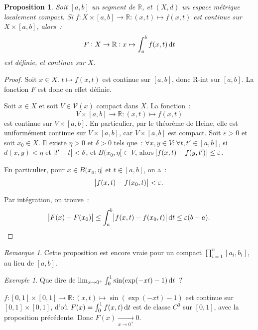 \documentclass{report}
\newtheorem{prp}[thm]{Proposition}
\theoremstyle{definition}
\theoremstyle{remark}
\newtheorem*{rmq}{Remarque}
\newtheorem{ex}{Exemple}[chapter]
\numberwithin{equation}{section}
\newcommand{\R}{\mathbb R}
\begin{document}
			\begin{prp}\label{prp:intparamcontinuesidefsurcpct} Soit $[a, b]$ un segment de $\R$, et $(X, d)$ un espace métrique localement compact.
			Si $f : X \times [a, b] \to \R : (x, t) \mapsto f(x, t)$ est continue sur $X \times [a, b]$, alors~:
			\begin{equation}
				F : X \to \R : x \mapsto \int_a^bf(x, t)\dif t
			\end{equation}
			est définie, et continue sur $X$.
			\end{prp}

			\begin{proof} Soit $x \in X$. $t \mapsto f(x, t)$ est continue sur $[a, b]$, donc R-int sur $[a, b]$. La fonction $F$ est donc en effet définie.

			Soit $x \in X$ et soit $V \in \mathcal V(x)$ compact dans $X$. La fonction~:
			\begin{equation}
				V \times [a, b] \to \R : (x, t) \mapsto f(x, t)
			\end{equation}
			est continue sur $V \times [a, b]$. En particulier, par le théorème de Heine, elle est uniformément continue sur $V \times [a, b]$, car $V \times [a, b]$
			est compact. Soit $\varepsilon > 0$ et soit $x_0 \in X$. Il existe $\eta > 0$ et $\delta > 0$ tels que~: $\forall x, y \in V : \forall t, t' \in [a, b]$,
			si $d(x, y) < \eta$ et $\abs {t'-t} < \delta$, et $B(x_0, \eta[ \subset V$, alors $\abs {f(x, t) - f(y, t')} \leq \varepsilon$.

			En particulier, pour $x \in B(x_0, \eta[$ et $t \in [a, b]$, on a~:
			\begin{equation}
				\abs {f(x, t) - f(x_0, t)} < \varepsilon.
			\end{equation}

			Par intégration, on trouve~:
			\begin{equation}
				\abs {F(x) - F(x_0)} \leq \int_a^b\abs {f(x, t) - f(x_0, t)}\dif t \leq \varepsilon (b-a).
			\end{equation}
			\end{proof}

			\begin{rmq} Cette proposition est encore vraie pour un compact $\prod_{i=1}^n[a_i, b_i]$, au lieu de $[a, b]$.
			\end{rmq}

			\begin{ex} Que dire de $\lim_{x \to 0^+} \int_0^1\sin(\exp(-xt) - 1)\dif t$~?

			$f : [0, 1] \times [0, 1]  \to \R : (x, t) \mapsto \sin(\exp(-xt) - 1)$ est continue sur $[0, 1] \times [0, 1]$, d'où $F(x) = \int_0^1f(x, t)\dif t$
			est de classe $C^0$ sur $[0, 1]$, avec la proposition précédente. Donc $F(x) \xrightarrow[x \to 0^+]{} 0$.
			\end{ex}
\end{document}
